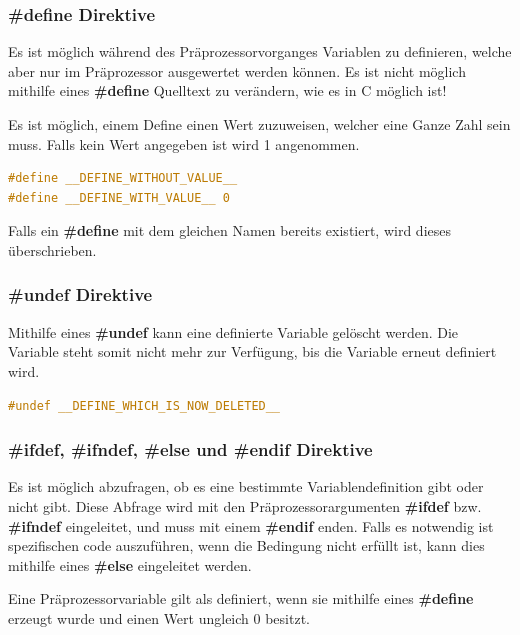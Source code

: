\subsubsection{\#define Direktive}

Es ist m\"oglich w\"ahrend des Pr\"aprozessorvorganges Variablen zu definieren, welche aber nur im Pr\"aprozessor ausgewertet werden k\"onnen. Es ist nicht m\"oglich mithilfe eines \textbf{\#define} Quelltext zu ver\"andern, wie es in C m\"oglich ist!

Es ist m\"oglich, einem Define einen Wert zuzuweisen, welcher eine Ganze Zahl sein muss. Falls kein Wert angegeben ist wird 1 angenommen.

\begin{lstlisting}[language=C]
#define __DEFINE_WITHOUT_VALUE__
#define __DEFINE_WITH_VALUE__ 0
\end{lstlisting}

Falls ein \textbf{\#define} mit dem gleichen Namen bereits existiert, wird dieses \"uberschrieben.

\subsubsection{\#undef Direktive}

Mithilfe eines \textbf{\#undef} kann eine definierte Variable gel\"oscht werden. Die Variable steht somit nicht mehr zur Verf\"ugung, bis die Variable erneut definiert wird.

\begin{lstlisting}[language=C]
#undef __DEFINE_WHICH_IS_NOW_DELETED__
\end{lstlisting}

\subsubsection{\#ifdef, \#ifndef, \#else und \#endif Direktive}

Es ist m\"oglich abzufragen, ob es eine bestimmte Variablendefinition gibt oder nicht gibt. Diese Abfrage wird mit den Pr\"aprozessorargumenten \textbf{\#ifdef} bzw. \textbf{\#ifndef} eingeleitet, und muss mit einem \textbf{\#endif} enden. Falls es notwendig ist spezifischen code auszuf\"uhren, wenn die Bedingung nicht erf\"ullt ist, kann dies mithilfe eines \textbf{\#else} eingeleitet werden.

Eine Pr\"aprozessorvariable gilt als definiert, wenn sie mithilfe eines \textbf{\#define} erzeugt wurde und einen Wert ungleich 0 besitzt.

